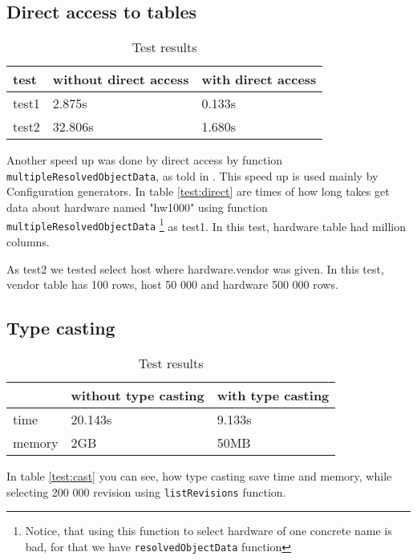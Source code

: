 \documentclass[deska]{subfiles}
\begin{document}
\subsection{Direct access to tables}
\label{sec:test-direct}

\label{test:direct}
\begin{longtable}{ l | l | l }
\caption{Test results}\\
test & without direct access & with direct access \\
\hline
\endhead
test1 & 2.875s & 0.133s \\
test2 & 32.806s & 1.680s \\
\end{longtable}

Another speed up was done by direct access by function {\tt multipleResolvedObjectData}, as told in .
This speed up is used mainly by Configuration generators.
In table \ref{test:direct} are times of how long takes get data about hardware named "hw1000" using function {\tt multipleResolvedObjectData}
\footnote{Notice, that using this function to select hardware of one concrete name is bad, for that we have
{\tt resolvedObjectData} function}
as test1. In this test, hardware table had million columns.

As test2 we tested select host where hardware.vendor was given. In this test, vendor table
has 100 rows, host 50 000 and hardware 500 000 rows.

\subsection{Type casting}
\label{sec:test-cast}

\label{test:cast}
\begin{longtable}{ l | l | l }
\caption{Test results}\\
& without type casting & with type casting \\
\hline
\endhead
time & 20.143s & 9.133s \\
memory & 2GB & 50MB \\
\end{longtable}

In table \ref{test:cast} you can see, how type casting save time and memory,
while selecting 200 000 revision using {\tt listRevisions} function.
\end{document}
